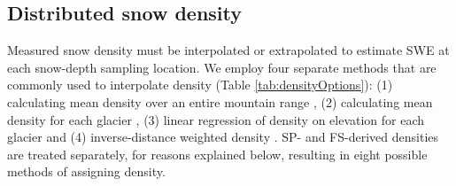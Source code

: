 \documentclass[twocolumn, letterpaper]{igs}
\begin{document}
\subsection{Distributed snow density}

Measured snow density must be interpolated or extrapolated to estimate SWE at each snow-depth sampling location. We employ four separate methods that are commonly used to interpolate density (Table \ref{tab:densityOptions}): (1) calculating mean density over an entire mountain range \citep[e.g.][]{Cullen2017}, (2) calculating mean density for each glacier \citep[e.g.][]{Elder1991, McGrath2015}, (3) linear regression of density on elevation for each glacier \citep[e.g.][]{Elder1998, Molotch2005} and (4) inverse-distance weighted density \citep[e.g.][]{Molotch2005}.  SP- and FS-derived densities are treated separately, for reasons explained below, resulting in eight possible methods of assigning density.
\end{document}
